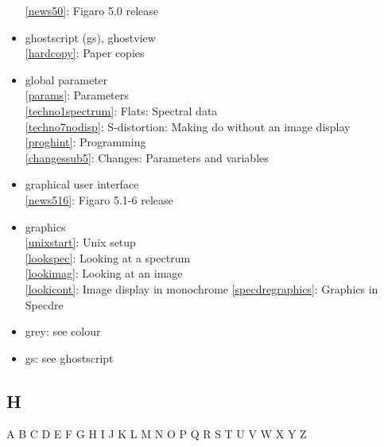 \documentclass[11pt,twoside]{article}
\newcommand{\htmlref}[2]{#1}
\newcommand{\idxint}[2]{\ref{#1}: \htmlref{#2}{#1}}
\newcommand{\idxint}[2]{\htmlref{#2}{#1}}
\begin{document}
\begin{itemize}
   \idxint{news50}{Figaro 5.0 release}
\item ghostscript (gs), ghostview\\
   \idxint{hardcopy}{Paper copies}
\item global parameter\\
   \idxint{params}{Parameters}\\
   \idxint{techno1spectrum}{Flats: Spectral data}\\
   \idxint{techno7nodisp}{S-distortion: Making do without an image display}\\
   \idxint{proghint}{Programming}\\
   \idxint{changessub5}{Changes: Parameters and variables}
\item graphical user interface\\
   \idxint{news516}{Figaro 5.1-6 release}
\item graphics\\
   \idxint{unixstart}{Unix setup}\\
   \idxint{lookspec}{Looking at a spectrum}\\
   \idxint{lookimag}{Looking at an image}\\
   \idxint{lookicont}{Image display in monochrome}
   \idxint{specdregraphics}{Graphics in Specdre}
\item grey: see colour
\item gs: see ghostscript
\end{itemize}

\subsection*{\label{index_H}H}

\begin{htmlonly}
\htmlref{A}{index_A}
\htmlref{B}{index_B}
\htmlref{C}{index_C}
\htmlref{D}{index_D}
\htmlref{E}{index_E}
\htmlref{F}{index_F}
\htmlref{G}{index_G}
H
\htmlref{I}{index_I}
\htmlref{J}{index_J}
\htmlref{K}{index_K}
\htmlref{L}{index_L}
\htmlref{M}{index_M}
\htmlref{N}{index_N}
\htmlref{O}{index_O}
\htmlref{P}{index_P}
\htmlref{Q}{index_Q}
\htmlref{R}{index_R}
\htmlref{S}{index_S}
\htmlref{T}{index_T}
\htmlref{U}{index_U}
\htmlref{V}{index_V}
\htmlref{W}{index_W}
\htmlref{X}{index_X}
\htmlref{Y}{index_Y}
Z
\end{htmlonly}
\end{document}
